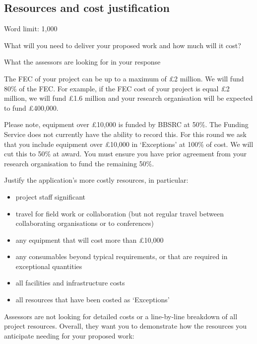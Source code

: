 \documentclass[11pt]{article}
\newenvironment{instruction}{%
    \begin{tcolorbox}[breakable,colback=red!5,colframe=red,title=Instruction]%
	}{%
    	\end{tcolorbox}%
	}
\begin{document}
% 

\pagebreak
\subsection{Resources and cost justification}

\begin{instruction}

Word limit: 1,000

What will you need to deliver your proposed work and how much will it cost?

What the assessors are looking for in your response

The FEC of your project can be up to a maximum of £2 million. We will fund
80\% of the FEC. For example, if the FEC cost of your project is equal £2
million, we will fund £1.6 million and your research organisation will be
expected to fund £400,000.

Please note, equipment over £10,000 is funded by BBSRC at 50\%. The
Funding Service does not currently have the ability to record this. For this round
we ask that you include equipment over £10,000 in ‘Exceptions’ at 100\% of
cost. We will cut this to 50\% at award. You must ensure you have prior
agreement from your research organisation to fund the remaining 50\%.

Justify the application’s more costly resources, in particular:

\begin{itemize}

	\item project staff significant

	\item travel for field work or collaboration (but not regular travel
between collaborating organisations or to conferences)

	\item any equipment that will cost more than £10,000

	\item any consumables beyond typical requirements, or that are required in
exceptional quantities

	\item all facilities and infrastructure costs

	\item all resources that have been costed as ‘Exceptions’

\end{itemize}

Assessors are not looking for detailed costs or a line-by-line breakdown of all
project resources. Overall, they want you to demonstrate how the resources
you anticipate needing for your proposed work:


\end{instruction}
\end{document}
